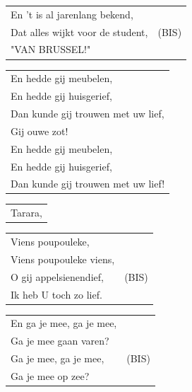 \documentclass[a4paper, 14pt]{extarticle}
\begin{document}
\begin{flushleft}
\begin{tabularx}{0.8\textwidth} {
   >{\raggedright\arraybackslash}X | c}
En ’t is al jarenlang bekend, & \\
Dat alles wijkt voor de student, & (BIS)\\
"VAN BRUSSEL!" & \\
\end{tabularx}
\end{flushleft}\begin{flushleft}
\begin{tabularx}{0.8\textwidth} {
   >{\raggedright\arraybackslash}X}
En hedde gij meubelen,\\
En hedde gij huisgerief,\\
Dan kunde gij trouwen met uw lief,\\
Gij ouwe zot!\\
En hedde gij meubelen,\\
En hedde gij huisgerief,\\
Dan kunde gij trouwen met uw lief!\\
\end{tabularx}
\end{flushleft}\begin{flushleft}
\begin{tabularx}{0.8\textwidth} {
   >{\raggedright\arraybackslash}X}
Tarara,\\\end{tabularx}
\begin{tabularx}{0.8\textwidth} {
   >{\raggedright\arraybackslash}X|c}
Viens poupouleke, &\\
Viens poupouleke viens, & \\
O gij appelsienendief, & (BIS)\\
Ik heb U toch zo lief. &\\
\end{tabularx}
\end{flushleft}\begin{flushleft}
\begin{tabularx}{0.8\textwidth} {
   >{\raggedright\arraybackslash}X|c}
En ga je mee, ga je mee, & \\
Ga je mee gaan varen? & \\
Ga je mee, ga je mee, & (BIS)\\
Ga je mee op zee? & \\
\end{tabularx}
\end{flushleft}\begin{flushleft}
\begin{tabularx}{0.8\textwidth} {
   >{\raggedright\arraybackslash}X}

\end{tabularx}
\end{flushleft}
\end{document}
